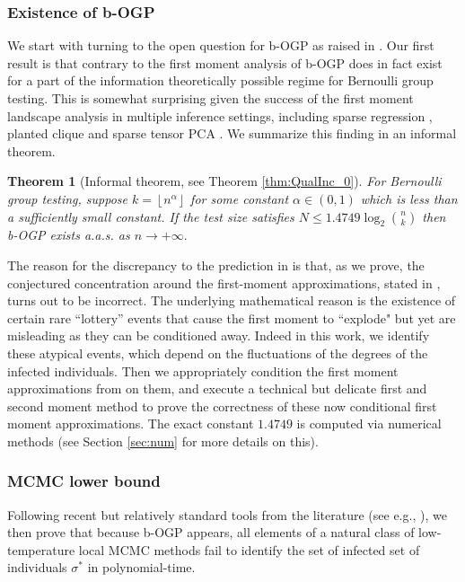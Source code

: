 \documentclass[12pt,reqno]{amsart}
\numberwithin{equation}{section}
\newtheorem{theorem}{Theorem}[section]
\theoremstyle{definition}
\newcommand{\floor}[1]{\left\lfloor #1 \right\rfloor}
\renewcommand{\[}{\begin{equation}}
\renewcommand{\]}{\end{equation}}
\renewcommand{\|}{\bigg{|}}
\begin{document}
\subsubsection{Existence of b-OGP}We start with turning to the open question for b-OGP as raised in \cite{iliopoulos2021group}. Our first result is that contrary to the first moment analysis of \cite{iliopoulos2021group} b-OGP does in fact exist for a part of the information theoretically possible regime for Bernoulli group testing. This is somewhat surprising given the success of the first moment landscape analysis in multiple inference settings, including sparse regression \cite{gamarnik2022sparse}, planted clique \cite{gamarnik2024overlap} and sparse tensor PCA \cite{arous2023free, chen2024low}. We summarize this finding in an informal theorem. \begin{theorem}[Informal theorem, see Theorem \ref{thm:QualInc_0}]\label{thm:1.4749}
    For Bernoulli group testing, suppose $k=\floor{n^{\alpha}}$ for some constant $\alpha \in (0,1)$ which is less than a sufficiently small constant. If the test size satisfies $N  \leq 1.4749 \log_2 \binom{n}{k}$ then b-OGP exists a.a.s. as $n \rightarrow +\infty.$
\end{theorem}


The reason for the discrepancy to the prediction in \cite{iliopoulos2021group} is that, as we prove, the conjectured concentration around the first-moment approximations, stated in  \cite[Conjecture 26]{iliopoulos2021group}, turns out to be incorrect. The underlying mathematical reason is the existence of certain rare ``lottery'' events that cause the first moment to ``explode" but yet are misleading as they can be conditioned away. Indeed in this work, we identify these atypical events, which depend on the fluctuations of the degrees of the infected individuals. Then we appropriately condition the first moment approximations from \cite{iliopoulos2021group} on them, and execute a technical but delicate first and second moment method to prove the correctness of these now conditional first moment approximations.  The exact constant $1.4749$ is computed via numerical methods (see Section \ref{sec:num} for more details on this).
 
 \subsubsection{MCMC lower bound}\label{sec:mcmc_intro} Following recent but relatively standard tools from the literature (see e.g., \cite{arous2023free, chen2024low}), we then prove that because b-OGP appears, all elements of a natural class of low-temperature local MCMC methods fail to identify the set of infected set of individuals $\sigma^*$ in polynomial-time.
 
\end{document}
